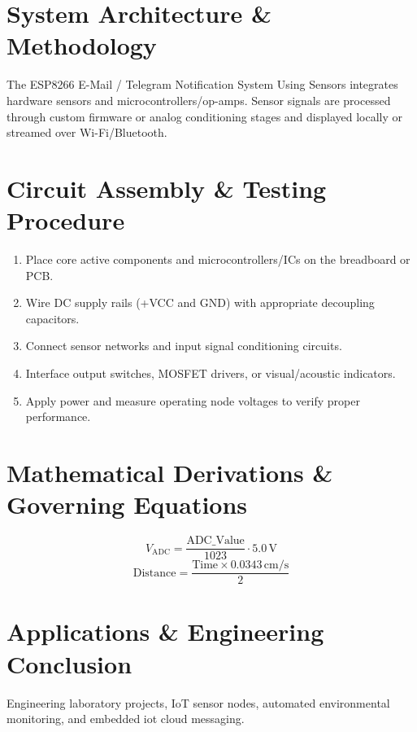 \documentclass[11pt,a4paper]{article}
\begin{document}
\section{System Architecture \& Methodology}
The ESP8266 E-Mail / Telegram Notification System Using Sensors integrates hardware sensors and microcontrollers/op-amps. Sensor signals are processed through custom firmware or analog conditioning stages and displayed locally or streamed over Wi-Fi/Bluetooth.

\section{Circuit Assembly \& Testing Procedure}
\begin{enumerate}
    \item Place core active components and microcontrollers/ICs on the breadboard or PCB.
    \item Wire DC supply rails (+VCC and GND) with appropriate decoupling capacitors.
    \item Connect sensor networks and input signal conditioning circuits.
    \item Interface output switches, MOSFET drivers, or visual/acoustic indicators.
    \item Apply power and measure operating node voltages to verify proper performance.
\end{enumerate}

\section{Mathematical Derivations \& Governing Equations}
\begin{equation}
V_{\text{ADC}} = \frac{\text{ADC\_Value}}{1023} \cdot 5.0\,\text{V}
\end{equation}
\begin{equation}
\text{Distance} = \frac{\text{Time} \times 0.0343\,\text{cm/s}}{2}
\end{equation}

\section{Applications \& Engineering Conclusion}
Engineering laboratory projects, IoT sensor nodes, automated environmental monitoring, and embedded iot cloud messaging.
\end{document}
